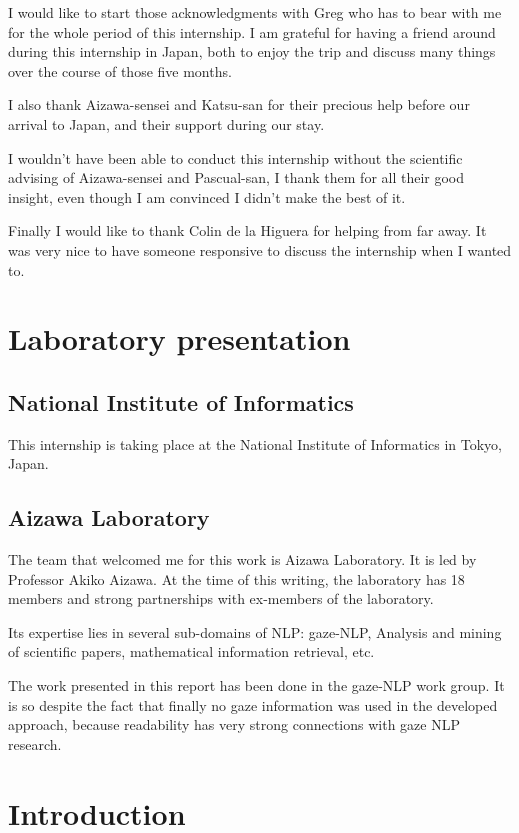 \documentclass[a4paper, 11pt]{scrreprt}
\begin{document}
I would like to start those acknowledgments with Greg who has to bear
with me for the whole period of this internship. I am grateful for
having a friend around during this internship in Japan, both to enjoy
the trip and discuss many things over the course of those five months.

I also thank Aizawa-sensei and Katsu-san for their precious help
before our arrival to Japan, and their support during our stay.

I wouldn't have been able to conduct this internship without the
scientific advising of Aizawa-sensei and Pascual-san, I thank them for
all their good insight, even though I am convinced I didn't make the
best of it.

Finally I would like to thank Colin de la Higuera for helping from far
away. It was very nice to have someone responsive to discuss the
internship when I wanted to.

\chapter{Laboratory presentation}

\section{National Institute of Informatics}
\label{sec:national-institute-of-informatics}

This internship is taking place at the National Institute of
Informatics in Tokyo, Japan.

\section{Aizawa Laboratory}
\label{sec:aizawa-laboratory}

The team that welcomed me for this work is Aizawa Laboratory. It is
led by Professor Akiko Aizawa. At the time of this writing, the
laboratory has 18 members and strong partnerships with ex-members of
the laboratory.

Its expertise lies in several sub-domains of NLP: gaze-NLP, Analysis
and mining of scientific papers, mathematical information retrieval,
etc.

The work presented in this report has been done in the gaze-NLP
work group. It is so despite the fact that finally no gaze information
was used in the developed approach, because readability has very
strong connections with gaze NLP research.

\chapter{Introduction}
\end{document}
